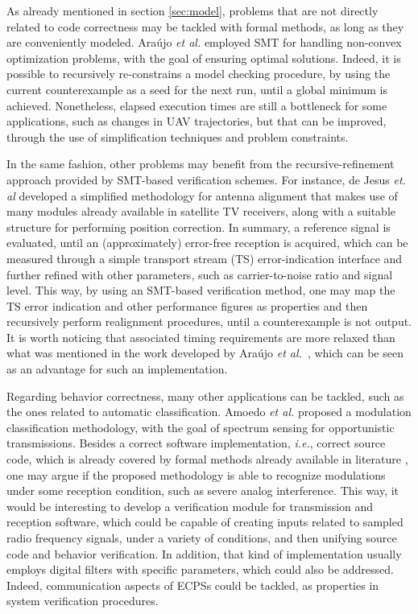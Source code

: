 \documentclass{cta-author}
\begin{document}
{{		As already mentioned in section \ref{sec:model}, problems that are not directly related to code correctness may be tackled with formal methods, as long as they are conveniently modeled. Ara\'ujo {\it et al.} \cite{ARAUJO2017} employed SMT for handling non-convex optimization problems, with the goal of ensuring optimal solutions. Indeed, it is possible to recursively re-constrains a model checking procedure, by using the current counterexample as a seed for the next run, until a global minimum is achieved. Nonetheless, elapsed execution times are still a bottleneck for some applications, such as changes in UAV trajectories, but that can be improved, through the use of simplification techniques and problem constraints.
		
		In the same fashion, other problems may benefit from the recursive-refinement approach provided by SMT-based verification schemes. For instance, de Jesus {\it et. al} \cite{antennasbrt} developed a simplified methodology for antenna alignment that makes use of many modules already available in satellite TV receivers, along with a suitable structure for performing position correction. In summary, a reference signal is evaluated, until an (approximately) error-free reception is acquired, which can be measured through a simple transport stream (TS) error-indication interface and further refined with other parameters, such as carrier-to-noise ratio and signal level. This way, by using an SMT-based verification method, one may map the TS error indication and other performance figures as properties and then recursively perform realignment procedures, until a counterexample is not output. It is worth noticing that associated timing requirements are more relaxed than what was mentioned in the work developed by Ara\'ujo {\it et al.}~\cite{ARAUJO2017}, which can be seen as an advantage for such an implementation.
		
		Regarding behavior correctness, many other applications can be tackled, such as the ones related to automatic classification. Amoedo {\it et al.} \cite{amoedo} proposed a modulation classification methodology, with the goal of spectrum sensing for opportunistic transmissions. Besides a correct software implementation, {\it i.e.}, correct source code, which is already covered by formal methods already available in literature \cite{esbmc_filter,Cordeiro12,Clarke04}, one may argue if the proposed methodology is able to recognize modulations under some reception condition, such as severe analog interference. This way, it would be interesting to develop a verification module for transmission and reception software, which could be capable of creating inputs related to sampled radio frequency signals, under a variety of conditions, and then unifying source code and behavior verification. In addition, that kind of implementation usually employs digital filters with specific parameters, which could also be addressed. Indeed, communication aspects of ECPSs could be tackled, as properties in system verification procedures.
		
}}
\end{document}
